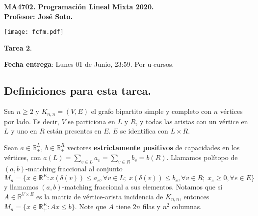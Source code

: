 \documentclass{article}
\newcommand{\RR}{\mathbb R}
\theoremstyle{plain}
\theoremstyle{definition}
\theoremstyle{Azul}
\begin{document}
\setlength{\headheight}{14pt}
\vspace*{-1.2 cm}
\begin{minipage}{0.6\textwidth}
	\begin{flushleft}
		\hspace*{-0.5cm}\textbf{MA4702. Programación Lineal Mixta 2020.}\\
		\hspace*{-0.5cm}\textbf{Profesor: José Soto.}\\
	\end{flushleft}
\end{minipage}
\begin{minipage}{0.36\textwidth}
	\begin{flushright}
		\texttt{[image: fcfm.pdf]}
	\end{flushright}
\end{minipage}
\bigskip

\newif\ifsol
\soltrue
\solfalse

\begin{center}
  \LARGE \textbf{Tarea 2}.\\
\end{center}
\bigskip

\noindent\textbf{Fecha entrega}: Lunes 01 de Junio, 23:59. Por u-cursos.\\

\subsection*{Definiciones para esta tarea.} 

Sea $n\geq 2$ y $K_{n,n}=(V,E)$ el grafo bipartito simple y completo con $n$ vértices por lado. Es decir, $V$ se particiona en $L$ y $R$, y todas las aristas con un vértice en $L$ y uno en $R$ están presentes en $E$. $E$ se identifica con $L\times R$.

Sean $a\in \RR_+^L$, $b\in \RR_+^R$ vectores \textbf{estrictamente positivos} de capacidades en los vértices, con $a(L)=\sum_{v\in L}a_v=\sum_{v\in R}b_v=b(R)$. Llamamos polítopo de $(a,b)$-matching fraccional al conjunto
$$M_n=\{x\in \RR^E\colon x(\delta(v))\leq a_v, \forall v\in L;\; x(\delta(v))\leq b_v, \forall v\in R;\; x_e\geq 0, \forall e\in E\}$$
y llamamos $(a,b)$-matching fraccional a sus elementos.
Notamos que si $A\in \RR^{V\times E}$ es la matriz de vértice-arista incidencia de $K_{n,n}$, entonces $M_n=\{x\in \RR^E_+\colon Ax\leq b\}$. Note que $A$ tiene $2n$ filas y $n^2$ columnas.
\end{document}
